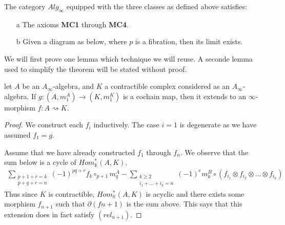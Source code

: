 \documentclass[../thesis.tex]{subfiles}
\begin{document}
        \begin{thm}\label{thm: model-A-inf}
            The category $Alg_\infty$ equipped with the three classes as defined above satisfies:
            \begin{itemize} 
                \item[a] The axioms \textbf{MC1} through \textbf{MC4}.
                \item[b] Given a diagram as below, where $p$ is a fibration, then its limit exists.
                \begin{center}
                \end{center}
            \end{itemize}
        \end{thm}

        We will first prove one lemma which technique we will reuse. A seconde lemma used to simplify the theorem will be stated without proof.

        \begin{lemma}\label{lem: inf-creator}
            let $A$ be an $A_\infty$-algebra, and $K$ a contractible complex considered as an $A_\infty$-algebra. If $g: (A,m_1^A) \rightarrow (K, m_1^K)$ is a cochain map, then it extends to an $\infty$-morphism $f: A \rightsquigarrow K$.
        \end{lemma}

        \begin{proof}
            We construct each $f_i$ inductively. The case $i=1$ is degenerate as we have assumed $f_1 = g$.

            Assume that we have already constructed $f_1$ through $f_n$. We observe that the sum below is a cycle of $Hom^*_\mathbb{K}(A,K)$.
            \begin{align*}
                \sum_{\substack{p + 1 + r = k \\ p + q + r = n}}(-1)^{pq+r}f_k\circ_{p+1}m^A_q - \sum_{\substack{k\geq 2 \\ i_1 + ... + i_k = n}}(-1)^{e}m^B_k \circ (f_{i_1}\otimes f_{i_2}\otimes ... \otimes f_{i_k})
            \end{align*}
            Thus since $K$ is contractible, $Hom^*_\mathbb{K}(A,K)$ is acyclic and there exists some morphism $f_{n+1}$ such that $\partial (f{n+1})$ is the sum above. This says that this extension does in fact satisfy $(rel_{n+1})$.
        \end{proof}
\end{document}
